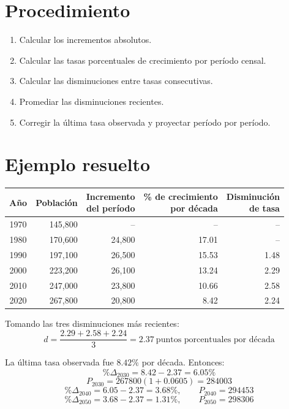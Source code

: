 \documentclass[12pt]{article}
\begin{document}
\section{Procedimiento}
\begin{enumerate}
\item Calcular los incrementos absolutos.
\item Calcular las tasas porcentuales de crecimiento por período censal.
\item Calcular las disminuciones entre tasas consecutivas.
\item Promediar las disminuciones recientes.
\item Corregir la última tasa observada y proyectar período por período.
\end{enumerate}

\section{Ejemplo resuelto}
\begin{center}
\begin{tabular}{crrrr}
\toprule
Año & Población & \makecell{Incremento\\del período} & \makecell{\% de crecimiento\\por década} & \makecell{Disminución\\de tasa} \\
\midrule
1970 & 145,800 & -- & -- & -- \\
1980 & 170,600 & 24,800 & 17.01 & -- \\
1990 & 197,100 & 26,500 & 15.53 & 1.48 \\
2000 & 223,200 & 26,100 & 13.24 & 2.29 \\
2010 & 247,000 & 23,800 & 10.66 & 2.58 \\
2020 & 267,800 & 20,800 & 8.42 & 2.24 \\
\bottomrule
\end{tabular}
\end{center}

Tomando las tres disminuciones más recientes:
\[
d=\frac{2.29+2.58+2.24}{3}=2.37\ \text{puntos porcentuales por década}
\]

La última tasa observada fue $8.42\%$ por década. Entonces:
\[
\%\Delta_{2030}=8.42-2.37=6.05\%
\]
\[
P_{2030}=\num{267800}(1+0.0605)=\num{284003}
\]
\[
\%\Delta_{2040}=6.05-2.37=3.68\%, \qquad P_{2040}=\num{294453}
\]
\[
\%\Delta_{2050}=3.68-2.37=1.31\%, \qquad P_{2050}=\num{298306}
\]

\end{document}
